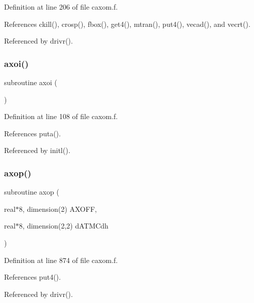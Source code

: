 Definition at line 206 of file caxom.\+f.



References ckill(), crosp(), fbox(), get4(), mtran(), put4(), vecad(), and vecrt().



Referenced by drivr().

\mbox{\label{caxom_8f_a893d9abb2fc624d31f3f79849346a6a4}} 
\subsubsection{\texorpdfstring{axoi()}{axoi()}}
{\footnotesize\ttfamily subroutine axoi (\begin{DoxyParamCaption}{ }\end{DoxyParamCaption})}



Definition at line 108 of file caxom.\+f.



References puta().



Referenced by initl().

\mbox{\label{caxom_8f_a0c171b7e33e1504b27bb7c0fb939383c}} 
\subsubsection{\texorpdfstring{axop()}{axop()}}
{\footnotesize\ttfamily subroutine axop (\begin{DoxyParamCaption}\item[{real$\ast$8, dimension(2)}]{A\+X\+O\+FF,  }\item[{real$\ast$8, dimension(2,2)}]{d\+A\+T\+M\+Cdh }\end{DoxyParamCaption})}



Definition at line 874 of file caxom.\+f.



References put4().



Referenced by drivr().

\mbox{\label{caxom_8f_aedf03a337fe3802d6bb5da15a890c6ef}} 
